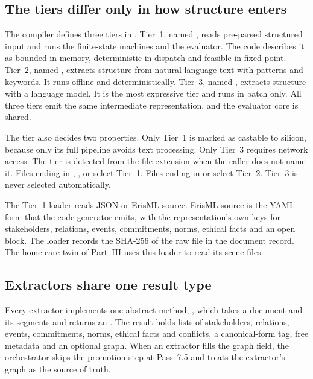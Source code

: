 \subsection{The tiers differ only in how structure enters}

The compiler defines three tiers in . Tier~1, named , reads
pre-parsed structured input and runs the finite-state machines and the evaluator. The code
describes it as bounded in memory, deterministic in dispatch and feasible in fixed point. Tier~2,
named , extracts structure from natural-language text with patterns and keywords. It
runs offline and deterministically. Tier~3, named , extracts structure with a language
model. It is the most expressive tier and runs in batch only. All three tiers emit the same
intermediate representation, and the evaluator core is shared.

The tier also decides two properties. Only Tier~1 is marked as castable to silicon, because only
its full pipeline avoids text processing. Only Tier~3 requires network access. The tier is
detected from the file extension when the caller does not name it. Files ending in
, ,  or  select Tier~1. Files ending in
 or  select Tier~2. Tier~3 is never selected automatically.

The Tier~1 loader reads JSON or ErisML source. ErisML source is the YAML form that the code
generator emits, with the representation's own keys for stakeholders, relations, events,
commitments, norms, ethical facts and an open  block. The loader records the SHA-256
of the raw file in the document record. The home-care twin of Part~III uses this loader to read its
scene files.

\subsection{Extractors share one result type}

Every extractor implements one abstract method, , which takes a document and its
segments and returns an . The result holds lists of stakeholders, relations,
events, commitments, norms, ethical facts and conflicts, a canonical-form tag, free metadata and an
optional graph. When an extractor fills the graph field, the orchestrator skips the promotion step
at Pass~7.5 and treats the extractor's graph as the source of truth.

